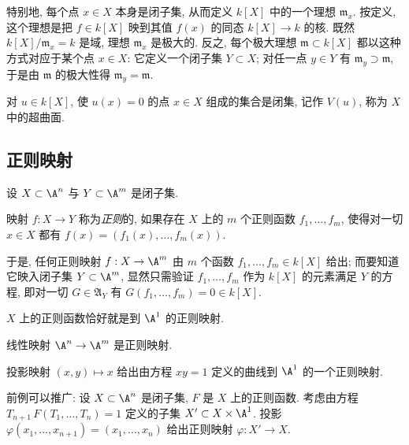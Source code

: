 特别地, 每个点 $x \in X$ 本身是闭子集, 从而定义 $k[X]$ 中的一个理想 $\mathfrak m_x$. 按定义, 这个理想是把 $f \in k[X]$ 映到其值 $f(x)$ 的同态 $k[X] \to k$ 的核. 既然 $k[X]/\mathfrak m_x = k$ 是域, 理想 $\mathfrak m_x$ 是极大的. 反之, 每个极大理想 $\mathfrak m \subset k[X]$ 都以这种方式对应于某个点 $x \in X$: 它定义一个闭子集 $Y \subset X$; 对任一点 $y \in Y$ 有 $\mathfrak m_y \supset \mathfrak m$, 于是由 $\mathfrak m$ 的极大性得 $\mathfrak m_y = \mathfrak m$.

对 $u \in k[X]$, 使 $u(x) = 0$ 的点 $x \in X$ 组成的集合是闭集, 记作 $V(u)$, 称为 $X$ 中的超曲面.

\subsection{正则映射}

设 $X \subset \A^n$ 与 $Y \subset \A^m$ 是闭子集.

\begin{definition}[正则映射]\label{def:regular-map-affine}
	映射 $f: X \to Y$ 称为\emph{正则}的, 如果存在 $X$ 上的 $m$ 个正则函数 $f_1, \ldots, f_m$, 使得对一切 $x \in X$ 都有 $f(x) = (f_1(x), \ldots, f_m(x))$.
\end{definition}

于是, 任何正则映射 $f: X \to \A^m$ 由 $m$ 个函数 $f_1, \ldots, f_m \in k[X]$ 给出; 而要知道它映入闭子集 $Y \subset \A^m$, 显然只需验证 $f_1, \ldots, f_m$ 作为 $k[X]$ 的元素满足 $Y$ 的方程, 即对一切 $G \in \mathfrak A_Y$ 有 $G(f_1, \ldots, f_m) = 0 \in k[X]$.

\begin{example}\label{exam:function-as-map}
	$X$ 上的正则函数恰好就是到 $\A^1$ 的正则映射.
\end{example}

\begin{example}\label{exam:linear-map}
	线性映射 $\A^n \to \A^m$ 是正则映射.
\end{example}

\begin{example}\label{exam:hyperbola-projection}
	投影映射 $(x, y) \mapsto x$ 给出由方程 $xy = 1$ 定义的曲线到 $\A^1$ 的一个正则映射.
\end{example}

\begin{example}\label{exam:local-invert}
	前例可以推广: 设 $X \subset \A^n$ 是闭子集, $F$ 是 $X$ 上的正则函数. 考虑由方程 $T_{n+1}\, F(T_1, \ldots, T_n) = 1$ 定义的子集 $X' \subset X \times \A^1$. 投影 $\varphi(x_1, \ldots, x_{n+1}) = (x_1, \ldots, x_n)$ 给出正则映射 $\varphi: X' \to X$.
\end{example}

